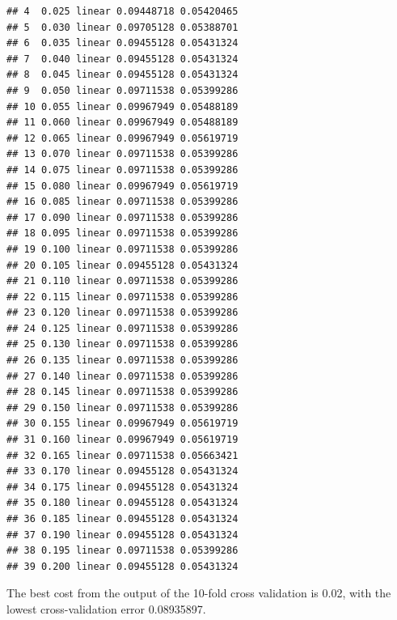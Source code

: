 \documentclass[12pt,fleqn]{article}\usepackage[]{graphicx}\usepackage[]{color}
\makeatletter
\newenvironment{kframe}{%
 \def\at@end@of@kframe{}%
 \ifinner\ifhmode%
  \def\at@end@of@kframe{\end{minipage}}%
  \begin{minipage}{\columnwidth}%
 \fi\fi%
 \def\FrameCommand##1{\hskip\@totalleftmargin \hskip-\fboxsep
 \colorbox{shadecolor}{##1}\hskip-\fboxsep
     \hskip-\linewidth \hskip-\@totalleftmargin \hskip\columnwidth}%
 \MakeFramed {\advance\hsize-\width
   \@totalleftmargin\z@ \linewidth\hsize
   \@setminipage}}%
 {\par\unskip\endMakeFramed%
 \at@end@of@kframe}
\newenvironment{knitrout}{}{} %
\theoremstyle{definition}
\makeatother
\begin{document}
\begin{enumerate}[1.]
\begin{enumerate}
\begin{knitrout}
\begin{kframe}
\begin{verbatim}
## 4  0.025 linear 0.09448718 0.05420465
## 5  0.030 linear 0.09705128 0.05388701
## 6  0.035 linear 0.09455128 0.05431324
## 7  0.040 linear 0.09455128 0.05431324
## 8  0.045 linear 0.09455128 0.05431324
## 9  0.050 linear 0.09711538 0.05399286
## 10 0.055 linear 0.09967949 0.05488189
## 11 0.060 linear 0.09967949 0.05488189
## 12 0.065 linear 0.09967949 0.05619719
## 13 0.070 linear 0.09711538 0.05399286
## 14 0.075 linear 0.09711538 0.05399286
## 15 0.080 linear 0.09967949 0.05619719
## 16 0.085 linear 0.09711538 0.05399286
## 17 0.090 linear 0.09711538 0.05399286
## 18 0.095 linear 0.09711538 0.05399286
## 19 0.100 linear 0.09711538 0.05399286
## 20 0.105 linear 0.09455128 0.05431324
## 21 0.110 linear 0.09711538 0.05399286
## 22 0.115 linear 0.09711538 0.05399286
## 23 0.120 linear 0.09711538 0.05399286
## 24 0.125 linear 0.09711538 0.05399286
## 25 0.130 linear 0.09711538 0.05399286
## 26 0.135 linear 0.09711538 0.05399286
## 27 0.140 linear 0.09711538 0.05399286
## 28 0.145 linear 0.09711538 0.05399286
## 29 0.150 linear 0.09711538 0.05399286
## 30 0.155 linear 0.09967949 0.05619719
## 31 0.160 linear 0.09967949 0.05619719
## 32 0.165 linear 0.09711538 0.05663421
## 33 0.170 linear 0.09455128 0.05431324
## 34 0.175 linear 0.09455128 0.05431324
## 35 0.180 linear 0.09455128 0.05431324
## 36 0.185 linear 0.09455128 0.05431324
## 37 0.190 linear 0.09455128 0.05431324
## 38 0.195 linear 0.09711538 0.05399286
## 39 0.200 linear 0.09455128 0.05431324
\end{verbatim}
\end{kframe}
\end{knitrout}
        The best cost from the output of the 10-fold cross validation is 0.02, with the lowest cross-validation error 0.08935897.


\end{enumerate}
\end{enumerate}
\end{document}
